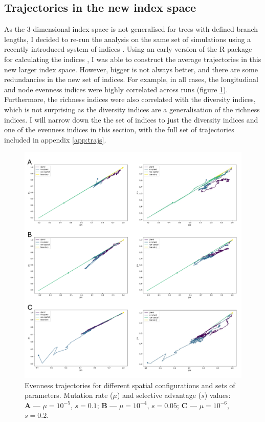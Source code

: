 \subsection{Trajectories in the new index space}
As the $3$-dimensional index space is not generalised for trees with defined
branch lengths, I decided to re-run the analysis on the same set of simulations
using a recently introduced system of indices \cite{noble_new_2023}. Using an
early version of the R package for calculating the indices
\cite{kimverity_kimverityruiindices_2023}, I was able to construct the average
trajectories in this new larger index space. However, bigger is not always
better, and there are some redundancies in the new set of indices. For example,
in all cases, the longitudinal and node evenness indices were highly correlated
across runs (figure \ref{fig:evenness_redundant}). Furthermore, the richness
indices were also correlated with the diversity indices, which is not
surprising as the diversity indices are a generalisation of the richness
indices. I will narrow down the the set of indices to just the
diversity indices and one of the evenness indices in this section, with the
full set of trajectories included in appendix \ref{app:trajs}.\par

\begin{figure}[h!]
    \centering
    \includegraphics[width=\textwidth]{Chapter_3/figures/redundancy.pdf}
    \caption{Evenness trajectories for different spatial configurations and
    sets of parameters. Mutation rate ($\mu$) and selective advantage ($s$)
    values:\\ \textbf{A} --- $\mu = 10^{-5}$, $s = 0.1$; \textbf{B} --- $\mu =
    10^{-4}$, $s = 0.05$; \textbf{C} --- $\mu = 10^{-6}$, $s = 0.2$.}
    \label{fig:evenness_redundant}
\end{figure}
\clearpage

